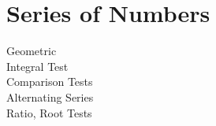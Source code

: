 \section{Series of Numbers}

Geometric\\
Integral Test\\
Comparison Tests\\
Alternating Series\\
Ratio, Root Tests\\

